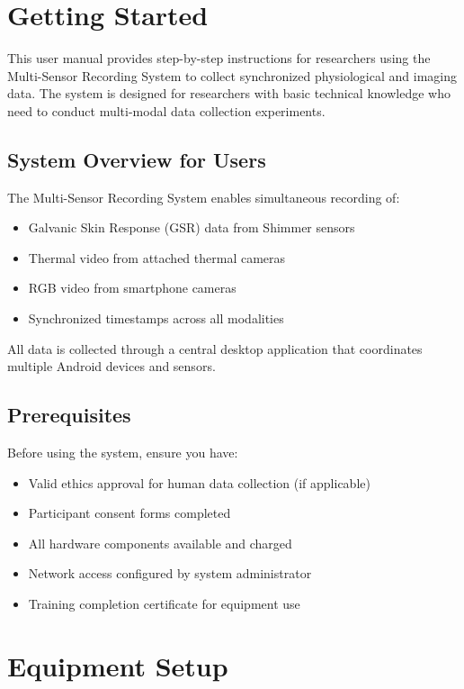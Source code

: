 \section{Getting Started}

This user manual provides step-by-step instructions for researchers using the Multi-Sensor Recording System to collect synchronized physiological and imaging data. The system is designed for researchers with basic technical knowledge who need to conduct multi-modal data collection experiments.

\subsection{System Overview for Users}

The Multi-Sensor Recording System enables simultaneous recording of:
\begin{itemize}
\item Galvanic Skin Response (GSR) data from Shimmer sensors
\item Thermal video from attached thermal cameras
\item RGB video from smartphone cameras
\item Synchronized timestamps across all modalities
\end{itemize}

All data is collected through a central desktop application that coordinates multiple Android devices and sensors.

\subsection{Prerequisites}

Before using the system, ensure you have:
\begin{itemize}
\item Valid ethics approval for human data collection (if applicable)
\item Participant consent forms completed
\item All hardware components available and charged
\item Network access configured by system administrator
\item Training completion certificate for equipment use
\end{itemize}

\section{Equipment Setup}

